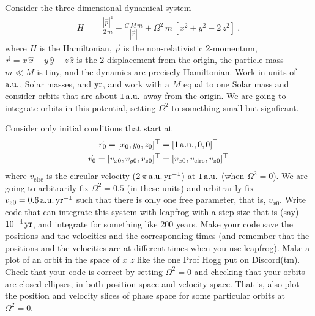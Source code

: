 \documentclass[12pt]{article}
\begin{document}
\begin{problem}
  Consider the three-dimensional dynamical system
  \begin{align}
    H &= \frac{|\vec{p}|^2}{2\,m} - \frac{G\,M\,m}{|\vec{r}|} + \Omega^2\,m\,[x^2 + y^2 - 2\,z^2] ~,
  \end{align}
  where $H$ is the Hamiltonian,
  $\vec{p}$ is the non-relativistic 2-momentum,
  $\vec{r}=x\,\hat{x}+y\,\hat{y}+z\,\hat{z}$ is the 2-displacement from the origin,
  the particle mass $m\ll M$ is tiny,
  and the dynamics are precisely Hamiltonian.
  Work in units of $\mathrm{a.u.}$, Solar masses, and $\mathrm{yr}$, and work with a $M$ equal to one Solar mass and consider orbits that are about $1\,\mathrm{a.u.}$ away from the origin.
  We are going to integrate orbits in this potential, setting $\Omega^2$ to something small but signficant.

  \subpart Consider only initial conditions that start at
  \begin{align}
    \vec{r}_0 = [x_0,y_0,z_0]^\top &= [1\,\mathrm{a.u.}, 0, 0]^\top \\
    \vec{v}_0 = [v_{x0},v_{y0},v_{z0}]^\top &= [v_{x0},v_\mathrm{circ},v_{z0}]^\top \,
  \end{align}
  where $v_\mathrm{circ}$ is the circular velocity ($2\,\pi\,\mathrm{a.u.}\,\mathrm{yr}^{-1}$) at $1\,\mathrm{a.u.}$ (when $\Omega^2=0$).
  We are going to arbitrarily fix $\Omega^2=0.5$ (in these units) and arbitrarily fix $v_{z0}=0.6\,\mathrm{a.u.}\,\mathrm{yr}^{-1}$ such that there is only one free parameter, that is, $v_{x0}$.
  Write code that can integrate this system with leapfrog with a step-size that is (say) $10^{-4}\,\mathrm{yr}$, and integrate for something like 200 years.
  Make your code save the positions and the velocities and the corresponding times (and remember that the positions and the velocities are at different times when you use leapfrog).
  Make a plot of an orbit in the space of $x$  $z$ like the one Prof Hogg put on Discord(tm).
  Check that your code is correct by setting $\Omega^2=0$ and checking that your orbits are closed ellipses, in both position space and velocity space.
  That is, also plot the position and velocity slices of phase space for some particular orbits at $\Omega^2=0$.


\end{problem}
\end{document}
